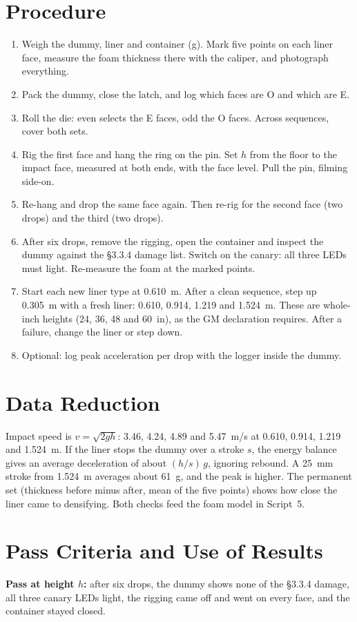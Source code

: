 \documentclass[final]{dbfdoc}
\begin{document}
\section{Procedure}
\begin{enumerate}
\item Weigh the dummy, liner and container (g). Mark five points on each liner face, measure the foam thickness there with the caliper, and photograph everything.
\item Pack the dummy, close the latch, and log which faces are O and which are E.
\item Roll the die: even selects the E faces, odd the O faces. Across sequences, cover both sets.
\item Rig the first face and hang the ring on the pin. Set $h$ from the floor to the impact face, measured at both ends, with the face level. Pull the pin, filming side-on.
\item Re-hang and drop the same face again. Then re-rig for the second face (two drops) and the third (two drops).
\item After six drops, remove the rigging, open the container and inspect the dummy against the §3.3.4 damage list. Switch on the canary: all three LEDs must light. Re-measure the foam at the marked points.
\item Start each new liner type at 0.610~m. After a clean sequence, step up 0.305~m with a fresh liner: 0.610, 0.914, 1.219 and 1.524~m. These are whole-inch heights (24, 36, 48 and 60~in), as the GM declaration requires. After a failure, change the liner or step down.
\item Optional: log peak acceleration per drop with the logger inside the dummy.
\end{enumerate}

\section{Data Reduction}
Impact speed is $v = \sqrt{2gh}$: 3.46, 4.24, 4.89 and 5.47~m/s at 0.610, 0.914, 1.219 and 1.524~m. If the liner stops the dummy over a stroke $s$, the energy balance gives an average deceleration of about $(h/s)\,g$, ignoring rebound. A 25~mm stroke from 1.524~m averages about 61~g, and the peak is higher. The permanent set (thickness before minus after, mean of the five points) shows how close the liner came to densifying. Both checks feed the foam model in Script~5.

\section{Pass Criteria and Use of Results}
\textbf{Pass at height $h$:} after six drops, the dummy shows none of the §3.3.4 damage, all three canary LEDs light, the rigging came off and went on every face, and the container stayed closed.
\end{document}
